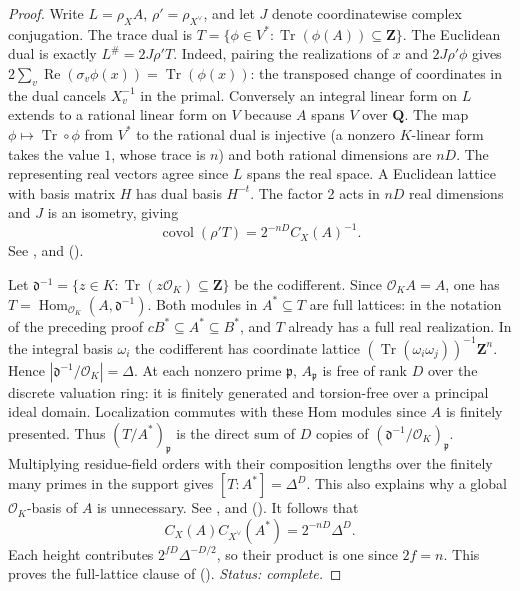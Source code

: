 \begin{proof}
Write $L=\rho_X A$, $\rho'=\rho_{X^\vee}$, and let $J$ denote
coordinatewise complex conjugation. The trace dual is
$T=\{\phi\in V^*:\operatorname{Tr}(\phi(A))\subseteq\mathbf Z\}$.
The Euclidean dual is exactly $L^\#=2J\rho' T$. Indeed, pairing the
realizations of $x$ and $2J\rho'\phi$ gives
$2\sum_v\operatorname{Re}(\sigma_v\phi(x))=\operatorname{Tr}(\phi(x))$:
the transposed change of coordinates in the dual cancels $X_v^{-1}$
in the primal. Conversely an integral linear form on $L$ extends to
a rational linear form on $V$ because $A$ spans $V$ over $\mathbf Q$.
The map $\phi\mapsto\operatorname{Tr}\circ\phi$ from $V^*$ to the
rational dual is injective (a nonzero $K$-linear form takes the value
$1$, whose trace is $n$) and both rational dimensions are $nD$.
The representing real vectors agree since $L$ spans the real space.
A Euclidean lattice with basis matrix $H$ has dual basis $H^{-t}$.
The factor 2 acts in $nD$ real dimensions and $J$ is an isometry, giving
\[
 \operatorname{covol}(\rho'T)=2^{-nD}C_X(A)^{-1}.
\]
See ,  and
 ().

Let $\mathfrak d^{-1}=\{z\in K:\operatorname{Tr}(z\mathcal O_K)
\subseteq\mathbf Z\}$ be the codifferent. Since $\mathcal O_K A=A$,
one has $T=\operatorname{Hom}_{\mathcal O_K}(A,\mathfrak d^{-1})$.
Both modules in $A^*\subseteq T$ are full lattices: in the notation of
the preceding proof $cB^*\subseteq A^*\subseteq B^*$, and $T$ already
has a full real realization. In the integral basis $\omega_i$ the
codifferent has coordinate lattice
$(\operatorname{Tr}(\omega_i\omega_j))^{-1}\mathbf Z^n$.
Hence $|\mathfrak d^{-1}/\mathcal O_K|=\Delta$.
At each nonzero prime $\mathfrak p$, $A_{\mathfrak p}$ is free of rank $D$
over the discrete valuation ring: it is finitely generated and
torsion-free over a principal ideal domain. Localization commutes with
these Hom modules since $A$ is finitely presented. Thus
$(T/A^*)_{\mathfrak p}$ is the direct sum of $D$ copies of
$(\mathfrak d^{-1}/\mathcal O_K)_{\mathfrak p}$. Multiplying residue-field
orders with their composition lengths over the finitely many primes in
the support gives $[T:A^*]=\Delta^D$. This also explains why a global
$\mathcal O_K$-basis of $A$ is unnecessary. See
,  and 
().
It follows that
\[
 C_X(A)C_{X^\vee}(A^*)=2^{-nD}\Delta^D .
\]
Each height contributes $2^{fD}\Delta^{-D/2}$, so their product is one
since $2f=n$. This proves the full-lattice clause of
 ().
\emph{Status: complete.}
\end{proof}

